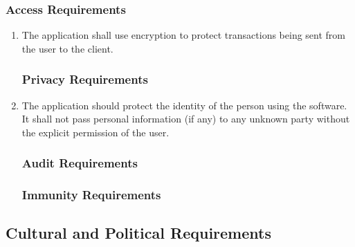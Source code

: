 \documentclass[]{article}
\begin{document}
\subsubsection{Access Requirements}
\label{ssub:access_requirements}
\begin{enumerate}[{SR}1. ]

\subsubsection{Integrity Requirements}
\label{ssub:integrity_requirements}
	\item The application shall use encryption to protect transactions being sent from the user to the client.


\subsubsection{Privacy Requirements}
\label{ssub:privacy_requirements}
	\item The application should protect the identity of the person using the software. It shall not pass personal information (if any) to any unknown party without the explicit permission of the user.

\subsubsection{Audit Requirements}
\label{ssub:audit_requirements}


\subsubsection{Immunity Requirements}
\label{ssub:immunity_requirements}
\end{enumerate}


\subsection{Cultural and Political Requirements}
\label{sub:cultural_and_political_requirements}
\end{document}
